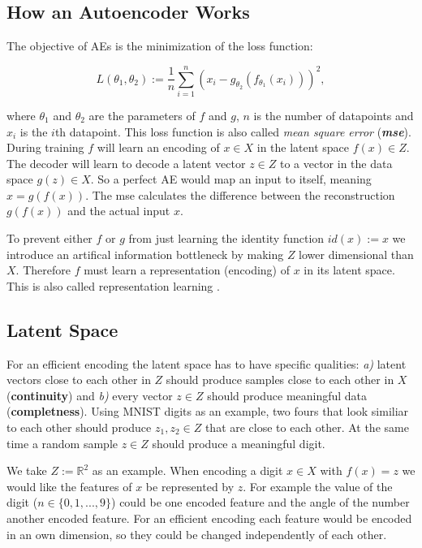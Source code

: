 \documentclass[a4paper]{IEEEtran}
\begin{document}
\subsection{How an Autoencoder Works}
The objective of AEs is the minimization of the loss function:

\begin{equation}
	L(\theta_1, \theta_2) := \frac{1}{n} \sum_{i = 1}^{n}{(x_i - g_{\theta_2}(f_{\theta_1}(x_i)))^2},
	\label{mse}
\end{equation}

where $\theta_1$ and $\theta_2$ are the parameters of $f$ and $g$, $n$ is the number of datapoints and $x_i$ is the $i$th datapoint. This loss function is also called \textit{mean square error} (\textit{\textbf{mse}}). During training $f$ will learn an encoding of $x \in X$ in the latent space $f(x) \in Z$. The decoder will learn to decode a latent vector $z \in Z$ to a vector in the data space $g(z) \in X$. So a perfect AE would map an input to itself, meaning $x = g(f(x))$. The mse calculates the difference between the reconstruction $g(f(x))$ and the actual input $x$.

To prevent either $f$ or $g$ from just learning the identity function $id(x) := x$ we introduce an artifical information bottleneck by making $Z$ lower dimensional than $X$. Therefore $f$ must learn a representation (encoding) of $x$ in its latent space. This is also called representation learning \cite{DBLP:journals/corr/abs-1206-5538}. 

\subsection{Latent Space}
For an efficient encoding the latent space has to have specific qualities: \textit{a)} latent vectors close to each other in $Z$ should produce samples close to each other in $X$ (\textbf{continuity}) and \textit{b)} every vector $z \in Z$ should produce meaningful data (\textbf{completness}). Using MNIST digits as an example, two fours that look similiar to each other should produce $z_1, z_2 \in Z$ that are close to each other. At the same time a random sample $z \in Z$ should produce a meaningful digit.

We take $Z := \mathbb{R}^{2}$ as an example. When encoding a digit $x \in X$ with $f(x) = z$ we would like the features of $x$ be represented by $z$. For example the value of the digit ($n \in \{0,1,...,9\}$) could be one encoded feature and the angle of the number another encoded feature. For an efficient encoding each feature would be encoded in an own dimension, so they could be changed independently of each other.
\end{document}
